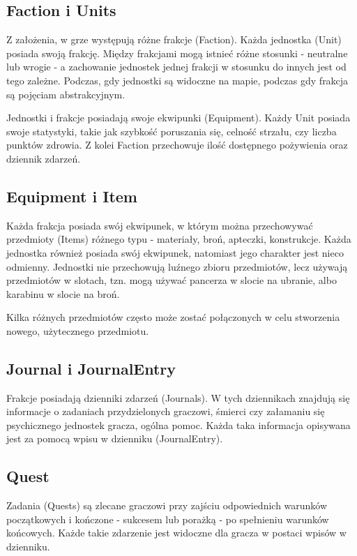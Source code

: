 \documentclass[licencjacka]{pracamgr}
\begin{document}
    \subsection{Faction i Units}
      Z założenia, w grze występują różne frakcje (Faction). Każda jednostka (Unit) posiada swoją frakcję. Między
      frakcjami mogą istnieć różne stosunki - neutralne lub wrogie - a zachowanie jednostek jednej frakcji w stosunku
      do innych jest od tego zależne. Podczas, gdy jednostki są widoczne na mapie, podczas gdy frakcja są
      pojęciam abstrakcyjnym.

      Jednostki i frakcje posiadają swoje ekwipunki (Equipment). Każdy Unit posiada swoje statystyki, takie jak
      szybkość poruszania się, celność strzału, czy liczba punktów zdrowia. Z kolei Faction przechowuje ilość
      dostępnego pożywienia oraz dziennik zdarzeń.

    \subsection{Equipment i Item}
      Każda frakcja posiada swój ekwipunek, w którym można przechowywać przedmioty (Items) różnego typu - materiały,
      broń, apteczki, konstrukcje. Każda jednostka również posiada swój ekwipunek, natomiast jego charakter jest nieco
      odmienny. Jednostki nie przechowują luźnego zbioru przedmiotów, lecz używają przedmiotów w slotach, tzn. mogą
      używać pancerza w slocie na ubranie, albo karabinu w slocie na broń.

      Kilka różnych przedmiotów często może zostać połączonych w celu stworzenia nowego, użytecznego przedmiotu.

    \subsection{Journal i JournalEntry}
      Frakcje posiadają dzienniki zdarzeń (Journals). W tych dziennikach znajdują się informacje o zadaniach
      przydzielonych graczowi, śmierci czy załamaniu się psychicznego jednostek gracza, ogólna pomoc. Każda taka
      informacja opisywana jest za pomocą wpisu w dzienniku (JournalEntry).

    \subsection{Quest}
      Zadania (Quests) są zlecane graczowi przy zajściu odpowiednich warunków początkowych i kończone - sukcesem lub
      porażką - po spełnieniu warunków końcowych. Każde takie zdarzenie jest widoczne dla gracza w postaci wpisów w
      dzienniku.
\end{document}

